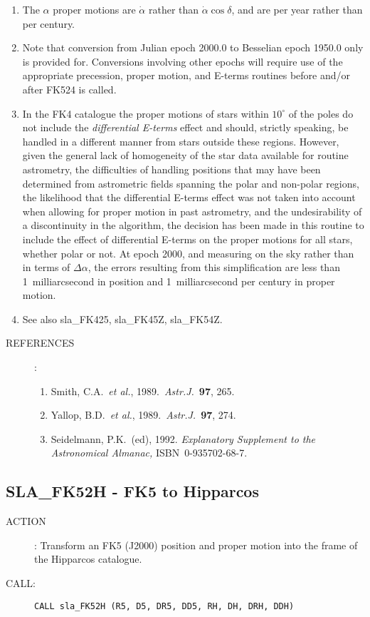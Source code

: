 \documentclass[11pt,twoside]{article}
\newcommand{\xlabel}[1]{}
\newcommand{\routine}[3]
{\hbadness=10000
  \vbox
  {
    \rule{\textwidth}{0.3mm}\\
    {\Large {\bf #1} \hfill #2 \hfill {\bf #1}}\\
    \setlength{\oldspacing}{\topsep}
    \setlength{\topsep}{0.3ex}
    \begin{description}
      #3
    \end{description}
    \setlength{\topsep}{\oldspacing}
  }
}
\renewcommand{\routine}[3]
   {
      \subsection{#1\xlabel{#1} - #2\label{#1}}
       \begin{description}
         #3
       \end{description}
   }
\newcommand{\action}[1]
{\item[ACTION]: #1}
\newcommand{\action}[1]
   {\item[ACTION:] #1}
\newcommand{\call}[1]
{\item[CALL]: \hspace{0.4em}{\tt #1}}
\newlength{\oldspacing}
\renewcommand{\call}[1]
   {
    \item[CALL:] {\tt #1}
   }
\newcommand{\refs}[1]
{
  \goodbreak
  \setlength{\oldspacing}{\topsep}
  \setlength{\topsep}{0.3ex}
  \begin{description}
    \item[REFERENCES]:
        #1
  \end{description}
  \setlength{\topsep}{\oldspacing}
}
\newcommand{\refs}[1]
   {
     \begin{description}
       \item[REFERENCES:]
           #1
     \end{description}
   }
\begin{document}
{
 \begin{enumerate}
  \item The $\alpha$ proper motions are $\dot{\alpha}$ rather than
        $\dot{\alpha}\cos\delta$, and are per year rather than per century.
  \item Note that conversion from Julian epoch 2000.0 to Besselian
        epoch 1950.0 only is provided for.  Conversions involving
        other epochs will require use of the appropriate precession,
        proper motion, and E-terms routines before and/or after
        FK524 is called.
  \item In the FK4 catalogue the proper motions of stars within
        $10^{\circ}$ of the poles do not include the {\it differential
        E-terms}\/ effect and should, strictly speaking, be handled
        in a different manner from stars outside these regions.
        However, given the general lack of homogeneity of the star
        data available for routine astrometry, the difficulties of
        handling positions that may have been determined from
        astrometric fields spanning the polar and non-polar regions,
        the likelihood that the differential E-terms effect was not
        taken into account when allowing for proper motion in past
        astrometry, and the undesirability of a discontinuity in
        the algorithm, the decision has been made in this routine to
        include the effect of differential E-terms on the proper
        motions for all stars, whether polar or not.  At epoch 2000,
        and measuring on the sky rather than in terms of $\Delta\alpha$,
        the errors resulting from this simplification are less than
        1~milliarcsecond in position and 1~milliarcsecond per
        century in proper motion.
  \item See also sla\_FK425, sla\_FK45Z, sla\_FK54Z.
 \end{enumerate}
}
\refs
{
 \begin{enumerate}
  \item Smith, C.A.\ {\it et al.}, 1989.\  {\it Astr.J.}\ {\bf 97}, 265.
  \item Yallop, B.D.\ {\it et al.}, 1989.\ {\it Astr.J.}\ {\bf 97}, 274.
  \item Seidelmann, P.K.\ (ed), 1992.  {\it Explanatory
        Supplement to the Astronomical Almanac,}\/ ISBN~0-935702-68-7.
 \end{enumerate}
}
\routine{SLA\_FK52H}{FK5 to Hipparcos}
{
 \action{Transform an FK5 (J2000) position and proper motion
         into the frame of the Hipparcos catalogue.}
 \call{CALL sla\_FK52H (R5, D5, DR5, DD5, RH, DH, DRH, DDH)}
}
\end{document}
